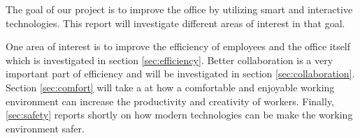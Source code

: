 The goal of our project is to improve the office by utilizing smart and interactive technologies. This report will investigate different areas of interest in that goal. 

One area of interest is to improve the efficiency of employees and the office itself which is investigated in section \ref{sec:efficiency}. Better collaboration is a very important part of efficiency and will be investigated in section \ref{sec:collaboration}. Section \ref{sec:comfort} will take a at how a comfortable and enjoyable working environment can increase the productivity and creativity of workers. Finally, \ref{sec:safety} reports shortly on how modern technologies can be make the working environment safer.